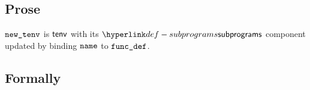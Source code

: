 \subsection{Prose}
$\newtenv$ is $\tenv$ with its $\subprograms$ component updated by binding $\name$ to $\funcdef$.

\subsection{Formally}
\begin{mathpar}
\end{mathpar}
